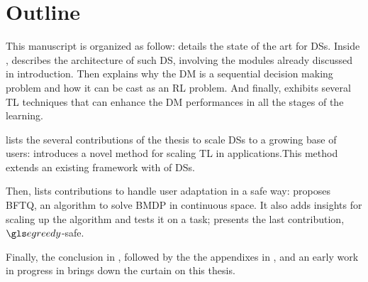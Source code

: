 \printbibliography[keyword={me},heading=none]

\section{Outline}


This manuscript is organized as follow:  details the state of the art for  \glspl{DS}. Inside ,  describes the architecture of such \gls{DS}, involving the modules already discussed in introduction. Then  explains why the \gls{DM} is a sequential decision making problem and how it can be cast as an \gls{RL} problem. And finally,  exhibits several \gls{TL} techniques that can enhance the \gls{DM} performances in all the stages of the learning.

 lists the several contributions of the thesis to scale \glspl{DS} to a growing base of users:  introduces a novel method for scaling \gls{TL} in  applications.This method extends an existing framework with  of \glspl{DS}.

Then,  lists contributions to handle user adaptation in a safe way:   proposes \gls{BFTQ}, an algorithm to solve \gls{BMDP} in continuous space. It also adds insights for scaling up the algorithm and tests it on a  task;  presents the last contribution, $\egreedy$-safe.

Finally, the conclusion in , followed by the the appendixes in , and an early work in progress in  brings down the curtain on this thesis.